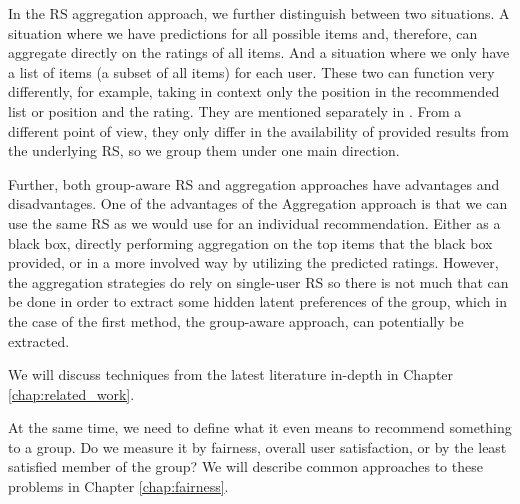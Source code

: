 
In the RS aggregation approach, we further distinguish between two situations. A situation where we have predictions for all possible items and, therefore, can aggregate directly on the ratings of all items. And a situation where we only have a list of items (a subset of all items) for each user. These two can function very differently, for example, taking in context only the position in the recommended list or position and the rating. They are mentioned separately in \cite{recommendations_to_groups-jameson2007}. From a different point of view, they only differ in the availability of provided results from the underlying RS, so we group them under one main direction.

Further, both group-aware RS and aggregation approaches have advantages and disadvantages. One of the advantages of the Aggregation approach is that we can use the same RS as we would use for an individual recommendation. Either as a black box, directly performing aggregation on the top items that the black box provided, or in a more involved way by utilizing the predicted ratings. However, the aggregation strategies do rely on single-user RS so there is not much that can be done in order to extract some hidden latent preferences of the group, which in the case of the first method, the group-aware approach, can potentially be extracted.


We will discuss techniques from the latest literature in-depth in Chapter \ref{chap:related_work}.


At the same time, we need to define what it even means to recommend something to a group. Do we measure it by fairness, overall user satisfaction, or by the least satisfied member of the group? We will describe common approaches to these problems in Chapter \ref{chap:fairness}.
